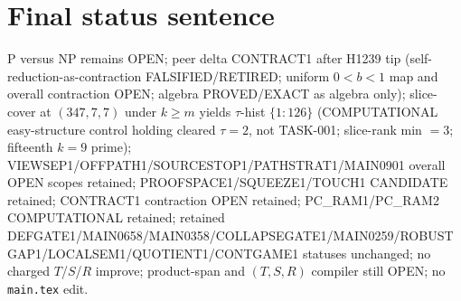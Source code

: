 \documentclass[11pt]{article}
\begin{document}
\section*{Final status sentence}
P versus NP remains OPEN; peer delta CONTRACT1 after H1239 tip (self-reduction-as-contraction FALSIFIED/RETIRED; uniform $0{<}b{<}1$ map and overall contraction OPEN; algebra PROVED/EXACT as algebra only); slice-cover at $(347,7,7)$ under $k{\ge}m$ yields $\tau$-hist $\{1{:}126\}$ (COMPUTATIONAL easy-structure control holding cleared $\tau{=}2$, not TASK-001; slice-rank min $=3$; fifteenth $k{=}9$ prime); VIEWSEP1/OFFPATH1/SOURCESTOP1/PATHSTRAT1/MAIN0901 overall OPEN scopes retained; PROOFSPACE1/SQUEEZE1/TOUCH1 CANDIDATE retained; CONTRACT1 contraction OPEN retained; PC\_RAM1/PC\_RAM2 COMPUTATIONAL retained; retained DEFGATE1/MAIN0658/MAIN0358/COLLAPSEGATE1/MAIN0259/ROBUSTGAP1/LOCALSEM1/QUOTIENT1/CONTGAME1 statuses unchanged; no charged $T$/$S$/$R$ improve; product-span and $(T,S,R)$ compiler still OPEN; no \texttt{main.tex} edit.
\end{document}
